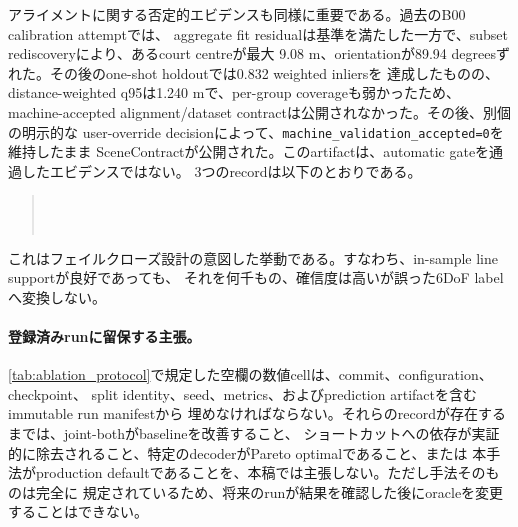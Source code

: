 アライメントに関する否定的エビデンスも同様に重要である。過去のB00 calibration attemptでは、
aggregate fit residualは基準を満たした一方で、subset rediscoveryにより、あるcourt centreが最大
9.08 m、orientationが89.94 degreesずれた。その後のone-shot holdoutでは0.832 weighted inliersを
達成したものの、distance-weighted q95は1.240 mで、per-group coverageも弱かったため、
machine-accepted alignment/dataset contractは公開されなかった。その後、別個の明示的な
user-override decisionによって、\texttt{machine\_validation\_accepted=0}を維持したまま
SceneContractが公開された。このartifactは、automatic gateを通過したエビデンスではない。
3つのrecordは以下のとおりである。
\begin{quote}\small
{}\\
\\
\end{quote}
これはフェイルクローズ設計の意図した挙動である。すなわち、in-sample line supportが良好であっても、
それを何千もの、確信度は高いが誤った6DoF labelへ変換しない。

\paragraph{登録済みrunに留保する主張。}
\cref{tab:ablation_protocol}で規定した空欄の数値cellは、commit、configuration、checkpoint、
split identity、seed、metrics、およびprediction artifactを含むimmutable run manifestから
埋めなければならない。それらのrecordが存在するまでは、joint-bothがbaselineを改善すること、
ショートカットへの依存が実証的に除去されること、特定のdecoderがPareto optimalであること、または
本手法がproduction defaultであることを、本稿では主張しない。ただし手法そのものは完全に
規定されているため、将来のrunが結果を確認した後にoracleを変更することはできない。



